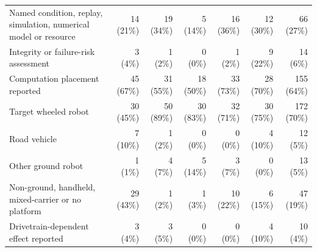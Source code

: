 \begin{table}[!t]
\begin{tabularx}{\linewidth}{@{}Yrrrrrr@{}}
Named condition, replay, simulation, numerical model or resource & 14 (21\%) & 19 (34\%) & 5 (14\%) & 16 (36\%) & 12 (30\%) & 66 (27\%) \\
Integrity or failure-risk assessment & 3 (4\%) & 1 (2\%) & 0 (0\%) & 1 (2\%) & 9 (22\%) & 14 (6\%) \\
Computation placement reported & 45 (67\%) & 31 (55\%) & 18 (50\%) & 33 (73\%) & 28 (70\%) & 155 (64\%) \\
Target wheeled robot & 30 (45\%) & 50 (89\%) & 30 (83\%) & 32 (71\%) & 30 (75\%) & 172 (70\%) \\
Road vehicle & 7 (10\%) & 1 (2\%) & 0 (0\%) & 0 (0\%) & 4 (10\%) & 12 (5\%) \\
Other ground robot & 1 (1\%) & 4 (7\%) & 5 (14\%) & 3 (7\%) & 0 (0\%) & 13 (5\%) \\
Non-ground, handheld, mixed-carrier or no platform & 29 (43\%) & 1 (2\%) & 1 (3\%) & 10 (22\%) & 6 (15\%) & 47 (19\%) \\
Drivetrain-dependent effect reported & 3 (4\%) & 3 (5\%) & 0 (0\%) & 0 (0\%) & 4 (10\%) & 10 (4\%) \\
\bottomrule
\end{tabularx}
\end{table}
